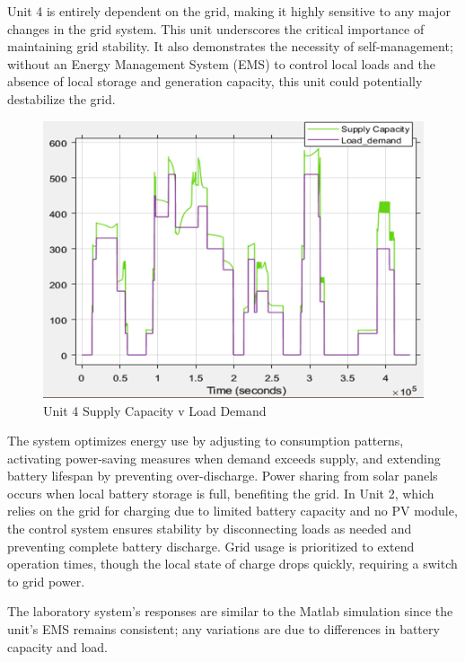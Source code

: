 Unit 4 is entirely dependent on the grid, making it highly sensitive to any major changes in the grid system. This unit underscores the critical importance of maintaining grid stability. It also demonstrates the necessity of self-management; without an Energy Management System (EMS) to control local loads and the absence of local storage and generation capacity, this unit could potentially destabilize the grid.
\begin{figure}[H]
	\centering
	\includegraphics[totalheight=6cm]{Figures/Unit 4 Supply Capacity v Load Demand.png}
	\caption{Unit 4 Supply Capacity v Load Demand}
\end{figure}
The system optimizes energy use by adjusting to consumption patterns, activating power-saving measures when demand exceeds supply, and extending battery lifespan by preventing over-discharge. Power sharing from solar panels occurs when local battery storage is full, benefiting the grid. In Unit 2, which relies on the grid for charging due to limited battery capacity and no PV module, the control system ensures stability by disconnecting loads as needed and preventing complete battery discharge. Grid usage is prioritized to extend operation times, though the local state of charge drops quickly, requiring a switch to grid power.\par
The laboratory system's responses are similar to the Matlab simulation since the unit's EMS remains consistent; any variations are due to differences in battery capacity and load.











